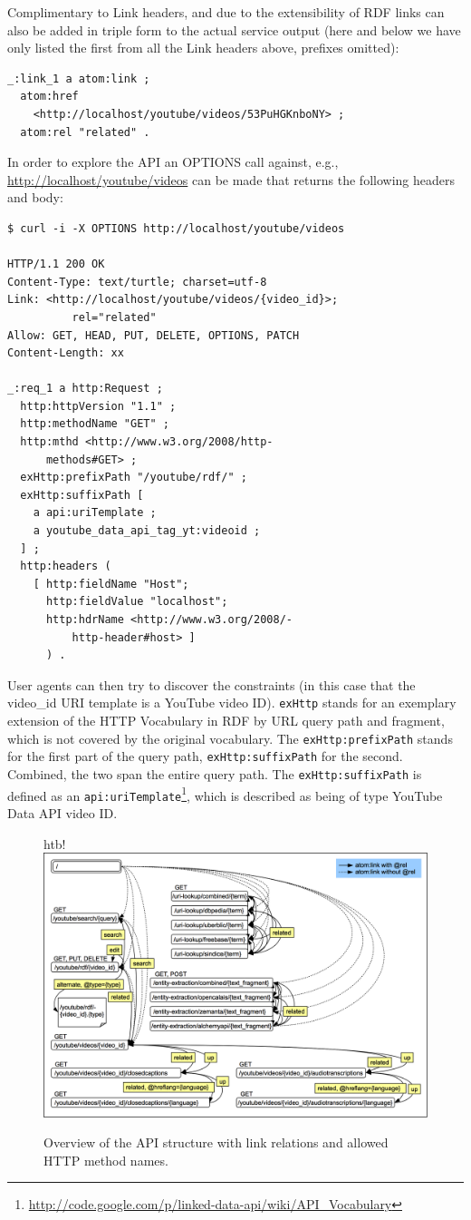 \documentclass{acm_proc_article-sp}
\begin{document}
Complimentary to Link headers, and due to the extensibility of RDF links can also be added in triple form to the actual service output (here and below we have only listed the first from all the Link headers above, prefixes omitted):
\begin{lstlisting}
_:link_1 a atom:link ;
  atom:href
    <http://localhost/youtube/videos/53PuHGKnboNY> ;
  atom:rel "related" .
\end{lstlisting}
In order to explore the API an OPTIONS call against, e.g., \url{http://localhost/youtube/videos} can be made that returns the following headers and body:
\begin{lstlisting}
$ curl -i -X OPTIONS http://localhost/youtube/videos

HTTP/1.1 200 OK
Content-Type: text/turtle; charset=utf-8
Link: <http://localhost/youtube/videos/{video_id}>;
          rel="related"
Allow: GET, HEAD, PUT, DELETE, OPTIONS, PATCH
Content-Length: xx

_:req_1 a http:Request ;
  http:httpVersion "1.1" ;
  http:methodName "GET" ;
  http:mthd <http://www.w3.org/2008/http-
      methods#GET> ;
  exHttp:prefixPath "/youtube/rdf/" ;
  exHttp:suffixPath [
    a api:uriTemplate ;
    a youtube_data_api_tag_yt:videoid ;
  ] ;
  http:headers (
    [ http:fieldName "Host";
      http:fieldValue "localhost";
      http:hdrName <http://www.w3.org/2008/-
          http-header#host> ]
      ) .
\end{lstlisting}
User agents can then try to discover the constraints (in this case that the {video\_id} URI template is a YouTube video ID). \texttt{exHttp} stands for an exemplary extension of the HTTP Vocabulary in RDF by URL query path and fragment, which is not covered by the original vocabulary. The \texttt{exHttp:prefixPath} stands for the first part of the query path, \texttt{exHttp:suffixPath} for the second. Combined, the two span the entire query path. The \texttt{exHttp:suffixPath} is defined as an \texttt{api:uriTemplate}\footnote{\url{http://code.google.com/p/linked-data-api/wiki/API_Vocabulary}}, which is described as being of type YouTube Data API video ID. 
\begin{figure}{htb!}
 \centering
 \includegraphics[width=1.0\linewidth]{statemachine.png}
 \caption{Overview of the API structure with link relations and allowed HTTP method names.}
 \label{fig:overview}
\end{figure}
\end{document}
